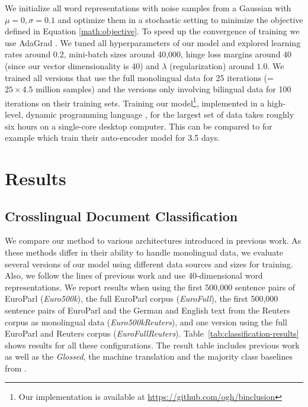 \documentclass{article} \usepackage{iclr2015,times}
\begin{document}
We initialize all word representations with noise samples from a Gaussian
with $\mu = 0, \sigma = 0.1$ and optimize them in a stochastic setting
to minimize the objective defined in Equation \ref{math:objective}.
To speed up the convergence of training we use AdaGrad
\citep{duchi2011adaptive}. We tuned all hyperparameters of our model
and explored learning rates around $0.2$, mini-batch sizes around 40,000,
hinge loss margins around 40 (since our vector dimensionality is 40) and
$\lambda$ (regularization) around $1.0$. We trained all versions
that use the full monolingual data for 25 iterations
(= $25 \times 4.5$ million samples) and the versions only involving bilingual
data for 100 iterations on their training sets.
Training our model\footnote{Our implementation is available at \url{https://github.com/ogh/binclusion}}, implemented in a high-level, dynamic programming language
\citep{bezanson2012julia}, for the largest set of data takes roughly
six hours on a single-core desktop computer.
This can be compared to for example \citet{chandar2014autoencoder} which train
their auto-encoder model for 3.5 days.

\section{Results}

\subsection{Crosslingual Document Classification}

We compare our method to various architectures introduced in previous work.
As these methods differ in their ability to handle monolingual data,
we evaluate several versions of our model using different data sources and
sizes for training.
Also, we follow the lines of previous work and use 40-dimensional
word representations.
We report results when
using
the first 500,000 sentence pairs of EuroParl (\emph{Euro500k}),
the full EuroParl corpus (\emph{EuroFull}),
the first 500,000 sentence pairs of EuroParl and the German and English text
    from the Reuters corpus as monolingual data (\emph{Euro500kReuters}),
and one version using the full EuroParl
    and Reuters corpus (\emph{EuroFullReuters}).
Table~\ref{tab:classification-results} shows results for all these
configurations.
The result table includes previous work as well as the
\emph{Glossed}, the machine translation and the majority class
baselines from \citet{klementiev2012inducing}.
\end{document}
